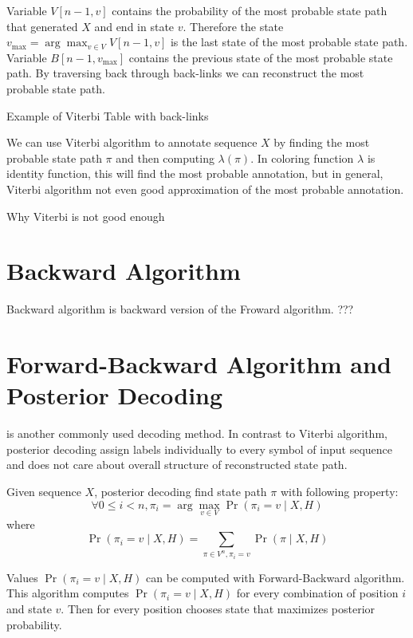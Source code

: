 Variable $V[n-1,v]$ contains the probability of the most probable state path
that generated $X$ and end in state $v$. Therefore the state $v_{\max} =
\arg\max_{v\in V}V[n-1,v]$ is the last state of the most probable state path.
Variable $B[n-1,v_{\max}]$ contains the previous state of the most probable
state path. By traversing back through back-links  we can reconstruct the most
probable state path.

\begin{example}
Example of Viterbi Table with back-links
\end{example}

We can use Viterbi algorithm to annotate sequence $X$ by finding the most
probable state path $\pi$ and then computing $\lambda(\pi)$. In coloring
function $\lambda$ is identity function, this will find the most probable
annotation, but in general, Viterbi algorithm not even good approximation of the
most probable annotation.

\begin{example}
Why Viterbi is not good enough
\end{example}

\section{Backward Algorithm}
Backward algorithm is backward version of the Froward algorithm. ???
\section{Forward-Backward Algorithm and Posterior Decoding}
 is another commonly used decoding method. In
contrast to Viterbi algorithm, posterior decoding assign labels individually to
every symbol of input sequence and does not care about overall structure of
reconstructed state path. 

Given sequence $X$, posterior decoding find state path $\pi$ with following
property:
\[\forall 0\leq i< n, \pi_i=\arg\max_{v\in V}\Pr\left(\pi_i=v\mid X,H\right) \]
where \[\Pr\left(\pi_i=v\mid X,H\right) = \sum_{\pi\in V^n,\pi_i=v}\Pr\left(\pi\mid X,H\right)\]

Values $\Pr\left(\pi_i=v\mid X,H\right)$ can be computed with Forward-Backward
algorithm. This algorithm computes $\Pr\left(\pi_i=v\mid X,H\right)$ for every
combination of position $i$ and state $v$. Then for every position chooses state
that maximizes posterior probability.

